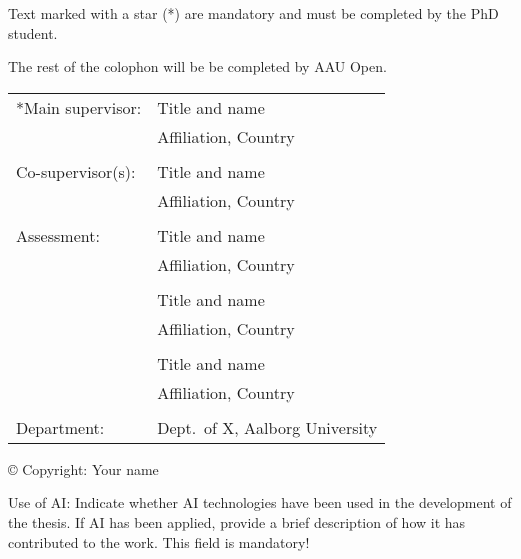 \thispagestyle{empty}
\noindent
\begin{center}
    \Large Text marked with a star (*) are mandatory and must be completed by the PhD student.
    \strut\vfill
    The rest of the colophon will be be completed by AAU Open.
\end{center}
\strut\vfill
\noindent \begin{tabularx}{\textwidth}{@{}lX}
    *Main supervisor: & Title and name\\
                      & Affiliation, Country\\
                      & \\
    Co-supervisor(s): & Title and name\\
                      & Affiliation, Country\\
                      & \\
    Assessment:       & Title and name\\
                      & Affiliation, Country\\
                      & \\
                      & Title and name\\
                      & Affiliation, Country\\
                      & \\
                      & Title and name\\
                      & Affiliation, Country\\
                      & \\
    Department:       & Dept.\ of X, Aalborg University\\
\end{tabularx}
\strut\vfill
\noindent *\copyright{} Copyright: Your name\newline
\strut\vfill
\noindent *Use of AI: Indicate whether AI technologies have been used in the development of the thesis. If AI has been applied, provide a brief description of how it has contributed to the work. This field is mandatory!
\strut\vfill
\clearpage

